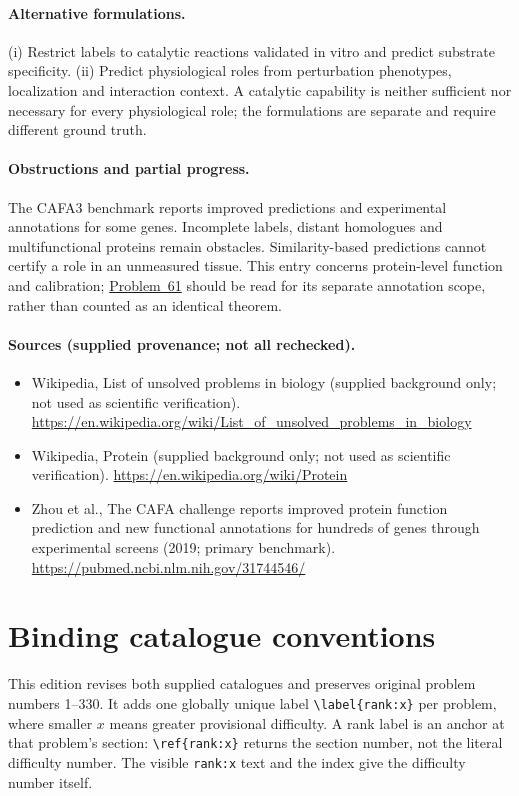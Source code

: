 \documentclass[11pt]{article}
\begin{document}
\paragraph{Alternative formulations.} (i) Restrict labels to catalytic reactions validated in vitro and predict substrate specificity. (ii) Predict physiological roles from perturbation phenotypes, localization and interaction context. A catalytic capability is neither sufficient nor necessary for every physiological role; the formulations are separate and require different ground truth.
\paragraph{Obstructions and partial progress.} The CAFA3 benchmark reports improved predictions and experimental annotations for some genes. Incomplete labels, distant homologues and multifunctional proteins remain obstacles. Similarity-based predictions cannot certify a role in an unmeasured tissue. This entry concerns protein-level function and calibration; \href{https://we-solve.github.io/problems/computational-protein-function-prediction-f60af957/}{Problem~61} should be read for its separate annotation scope, rather than counted as an identical theorem.
\paragraph{Sources (supplied provenance; not all rechecked).}
\begin{itemize}
\item Wikipedia, List of unsolved problems in biology (supplied background only; not used as scientific verification). \url{https://en.wikipedia.org/wiki/List_of_unsolved_problems_in_biology}
\item Wikipedia, Protein (supplied background only; not used as scientific verification). \url{https://en.wikipedia.org/wiki/Protein}
\item Zhou et al., The CAFA challenge reports improved protein function prediction and new functional annotations for hundreds of genes through experimental screens (2019; primary benchmark). \url{https://pubmed.ncbi.nlm.nih.gov/31744546/}
\end{itemize}


\section*{Binding catalogue conventions}
This edition revises both supplied catalogues and preserves original problem numbers 1--330. It adds one globally unique label \verb|\label{rank:x}| per problem, where smaller $x$ means greater provisional difficulty. A rank label is an anchor at that problem's section: \verb|\ref{rank:x}| returns the section number, not the literal difficulty number. The visible \texttt{rank:x} text and the index give the difficulty number itself.
\end{document}

